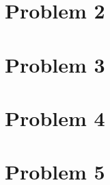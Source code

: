 \documentclass[twoside,11pt]{homework}
\begin{document}
\section*{Problem 2}


\section*{Problem 3}


\section*{Problem 4}


\section*{Problem 5}

\end{document}
